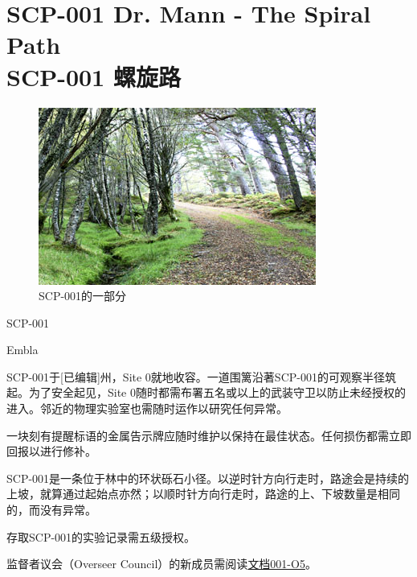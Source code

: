 \chapter[SCP-001 螺旋路]{
	SCP-001 Dr. Mann - The Spiral Path \\
	SCP-001 螺旋路
}

\label{chap:SCP-001.the.spiral.path}

\begin{figure}[H]
	\centering
	\includegraphics[width=0.5\linewidth]{images/SCP.001.the.spiral.path.jpg}
	\caption*{SCP-001的一部分}
\end{figure}

SCP-001

Embla

SCP-001于[已编辑]州，Site 0就地收容。一道围篱沿著SCP-001的可观察半径筑起。为了安全起见，Site 0随时都需布署五名或以上的武装守卫以防止未经授权的进入。邻近的物理实验室也需随时运作以研究任何异常。

一块刻有提醒标语的金属告示牌应随时维护以保持在最佳状态。任何损伤都需立即回报以进行修补。

SCP-001是一条位于林中的环状砾石小径。以逆时针方向行走时，路途会是持续的上坡，就算通过起始点亦然；以顺时针方向行走时，路途的上、下坡数量是相同的，而没有异常。

存取SCP-001的实验记录需五级授权。

监督者议会（Overseer Council）的新成员需阅读\hyperref[sec:DOC-001-05]{文档001-O5}。


